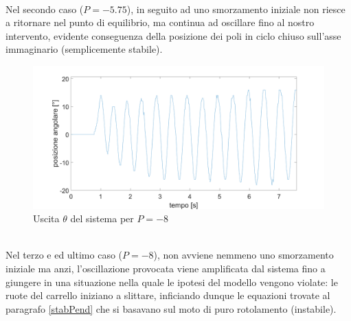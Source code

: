 \\Nel secondo caso ($P=-5.75$), in seguito ad uno smorzamento iniziale non riesce a ritornare nel punto di equilibrio, ma continua ad oscillare fino al nostro intervento, evidente conseguenza della posizione dei poli in ciclo chiuso sull'asse immaginario (semplicemente stabile). 
\begin{figure}[ht]
	\centering
	\includegraphics[width=\linewidth]{oscGain8.png}
	\caption{Uscita $\theta$ del sistema per $P=-8$}
	\label{oscGain8}
\end{figure}
\\ Nel terzo e ed ultimo caso ($P=-8$), non avviene nemmeno uno smorzamento iniziale ma anzi, l'oscillazione provocata viene amplificata dal sistema fino a giungere in una situazione nella quale le ipotesi del modello vengono violate: le ruote del carrello iniziano a slittare, inficiando dunque le equazioni trovate al paragrafo \ref{stabPend} che si basavano sul moto di puro rotolamento (instabile).

